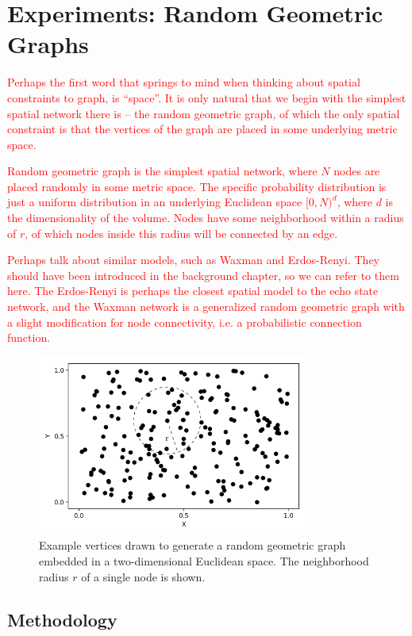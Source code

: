 \chapter{Experiments: Random Geometric Graphs}
\label{ch:rgg}

\textcolor{red}{
  Perhaps the first word that springs to mind when thinking about spatial
constraints to graph, is ``space''. It is only natural that we begin with the
simplest spatial network there is -- the random geometric graph, of which the
only spatial constraint is that the vertices of the graph are placed in some
underlying metric space.
}

\textcolor{red}{
  Random geometric graph is the simplest spatial network, where $N$ nodes are
placed randomly in some metric space. The specific probability distribution is
just a uniform distribution in an underlying Euclidean space $[0, N)^d$, where
$d$ is the dimensionality of the volume. Nodes have some neighborhood within a
radius of $r$, of which nodes inside this radius will be connected by an edge.
}

\textcolor{red}{
  Perhaps talk about similar models, such as Waxman and Erdos-Renyi. They should
have been introduced in the background chapter, so we can refer to them
here. The Erdos-Renyi is perhaps the closest spatial model to the echo state
network, and the Waxman network is a generalized random geometric graph with a
slight modification for node connectivity, i.e. a probabilistic connection
function.
}

\begin{figure}[t]
  \centering
  \includegraphics[width=3.5in]{figures/RGG-example.png}
  \caption{
    Example vertices drawn to generate a random geometric graph embedded in a
two-dimensional Euclidean space. The neighborhood radius $r$ of a single node is
shown.
  }
  \label{fig:rgg-example}
\end{figure}

\section{Methodology}

